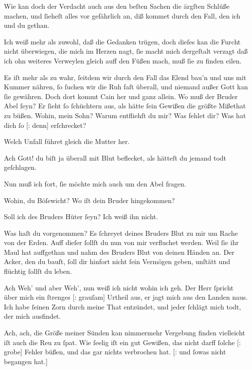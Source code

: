 \documentclass[tocstyle=ref-genre]{ees}
\begin{document}
{\begin{movement}{}
  \voice[Eva]
  Wie kan doch der Verdacht auch aus den beſten Sachen
  die ärgſten Schlüße machen,
  und ſieheſt alles vor gefährlich an,
  diß kommet durch den Fall, den ich und du gethan.

  \voice[Adam]
  Ich weiß mehr als zuwohl, daß die Gedanken trügen,
  doch dieſes kan die Furcht nicht überwiegen,
  die mich im Herzen nagt,
  ſie macht mich dergeſtalt verzagt
  daß ich ohn weiteres Verweylen
  gleich auff den Füßen mach, muß ſie zu finden eilen.

  \voice[Eva]
  Es iſt mehr als zu wahr, ſeitdem wir durch den Fall
  das Elend bau’n und uns mit Kummer nähren,
  ſo ſuchen wir die Ruh faſt überall,
  und niemand außer Gott kan ſie gewähren.
  Doch dort kommt Cain her und ganz allein.
  Wo muß der Bruder Abel ſeyn?
  Er ſieht ſo ſchüchtern aus, als hätte ſein Gewißen
  die größte Mißethat zu büßen.
  Wohin, mein Sohn? Warum entfliehſt du mir?
  Was fehlet dir?
  Was hat dich ſo [: denn] erſchrecket?

  \voice[Cain]
  Welch Unfall führet gleich die Mutter her.

  \voice[Eva]
  Ach Gott! du biſt ja überall mit Blut beflecket,
  als hätteſt du jemand todt geſchlagen.

  \voice[Cain]
  Nun muß ich fort, ſie möchte mich
  auch um den Abel fragen.

  Wohin, du Böſewicht?
  Wo iſt dein Bruder hingekommen?

  \voice[Cain]
  Soll ich des Bruders Hüter ſeyn? Ich weiß ihn nicht.

  Was haſt du vorgenommen?
  Es ſchreyet deines Bruders Blut
  zu mir um Rache von der Erden.
  Auff dieſer ſollſt du nun von mir verfluchet werden.
  Weil ſie ihr Maul hat auffgethan
  und nahm des Bruders Blut von deinen Händen an.
  Der Acker, den du bauſt,
  ſoll dir hinfort nicht ſein Vermögen geben,
  unſtätt und flüchtig ſollſt du leben.

  \voice[Cain]
  Ach Weh’ und aber Weh’,
  nun weiß ich nicht wohin ich geh.
  Der Herr ſpricht über mich ein ſtrenges [: grauſam] Urtheil aus,
  er jagt mich aus den Landen naus.
  Ich habe ſeinen Zorn durch meine That entzündet,
  und jeder ſchlägt mich todt, der mich ausfindet.
\end{movement}

\begin{movement}{}
  \voice[Cain]
  Ach, ach, die Größe meiner Sünden
  kan nimmermehr Vergebung finden
  vielleicht iſt auch die Reu zu ſpat.
  Wie ſeelig iſt ein gut Gewißen,
  das nicht darff ſolche [: grobe] Fehler büßen,
  und das gar nichts verbrochen hat.
  [: und ſowas nicht begangen hat.]
\end{movement}

}
\end{document}
